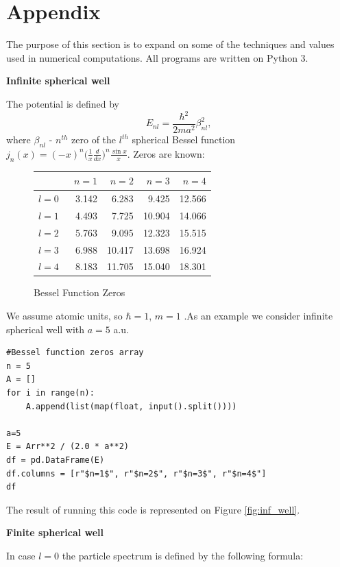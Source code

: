 \documentclass[a4paper, 12pt]{article}
\begin{document}
\section{Appendix}\label{appendix}
The purpose of this section is to expand on some of the techniques and values used in numerical computations. All programs are written on Python 3.
\begin{center}
		\large
		\textbf{ Infinite spherical well}		\\[0.5 cm]
\end{center}
The potential is defined by 
$$E_{nl} = \frac{\hbar^2}{2ma^2}\beta_{nl}^2,$$
where $\beta_{nl}$ -  $n^{th}$ zero of the $l^{th}$ spherical Bessel function $j_n(x) = (-x)^n\bigg(\displaystyle{\frac{1}{x} \frac{d}{dx}}\bigg)^n \frac{\sin{x}}{x}.$
Zeros are known:
\begin{figure}[h!]
\centering
\begin{tabular}{lrrrr}
\toprule
{} &  \ $n=1$ &   $n=2$ &   $n=3$ &   $n=4$ \\
\midrule
$l=0$ &  3.142 &   6.283 &   9.425 &  12.566 \\
$l=1$ &  4.493 &   7.725 &  10.904 &  14.066 \\
$l=2$ &  5.763 &   9.095 &  12.323 &  15.515 \\
$l=3$ &  6.988 &  10.417 &  13.698 &  16.924 \\
$l=4$ &  8.183 &  11.705 &  15.040 &  18.301 \\
\bottomrule
\end{tabular}
\caption{Bessel Function Zeros}
\end{figure}
We assume atomic units, so $\hbar =  1$, $m=  1$ .As an example we consider infinite spherical well with $a= 5$ a.u.
\begin{lstlisting}[frame=single]
#Bessel function zeros array
n = 5
A = [] 
for i in range(n): 
    A.append(list(map(float, input().split())))
    
a=5
E = Arr**2 / (2.0 * a**2)
df = pd.DataFrame(E)
df.columns = [r"$n=1$", r"$n=2$", r"$n=3$", r"$n=4$"]
df
\end{lstlisting}
The result of running this code is represented on Figure \ref{fig:inf_well}.
\pagebreak


\begin{center}
		\large
		\textbf{Finite spherical well}		\\[0.5 cm]
\end{center}
In case $l=0$ the particle spectrum is defined by the following formula:




%
%






\end{document}
